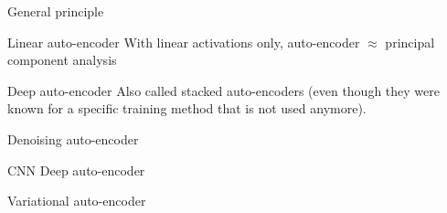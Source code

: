 \begin{frame}{General principle}
\end{frame}

\begin{frame}{Linear auto-encoder}
  With linear activations only, auto-encoder $\approx$ principal component analysis

\end{frame}

\begin{frame}{Deep auto-encoder}
  Also called stacked auto-encoders (even though they were known for a specific training method that is not used anymore).

\end{frame}

\begin{frame}{Denoising auto-encoder}
\end{frame}

\begin{frame}{CNN Deep auto-encoder}
\end{frame}

\begin{frame}{Variational auto-encoder}
\end{frame}
